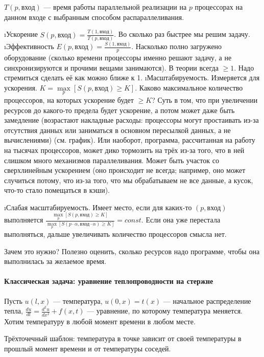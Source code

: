 $T(p, \text{вход})$ --- время работы параллельной реализации на $p$ процессорах на данном входе с выбранным способом распараллеливания.
\begin{enumerate}
\i Ускорение $S(p, \text{вход}) = \frac{T(1, \text{вход})}{T(p, \text{вход})}$. Во сколько раз быстрее мы решим задачу.
\i Эффективность $E(p, \text{вход}) = \frac{S(1, \text{вход})}{p}$. Насколько полно загружено оборудование (сколько времени процессоры именно решают задачу, а не синхронизируются и прочими вещами занимаются). В теории всегда $\ge 1$. Надо стремиться сделать её как можно ближе к 1.
\i Масштабируемость. Измеряется для ускорения. $K = \max\limits_p [S(p, \text{вход}) \ge K]$. Каково максимальное количество процессоров, на которых ускорение будет $\ge K$? Суть в том, что при увеличении ресурсов до какого-то предела будет ускорение, а потом может даже быть замедление (возрастают накладные расходы: процессоры могут простаивать из-за отсутствия данных или заниматься в основном пересылкой данных, а не вычислениями) (см. график). Или наоборот, программа, рассчитанная на работу на тысячах процессоров, может дико тормозить на трёх из-за того, что в ней слишком много механизмов параллеливания. Может быть участок со сверхлинейным ускорением (оно происходит не всегда; например, оно может случиться потому, что из-за того, что мы обрабатываем не все данные, а кусок, что-то стало помещаться в кэши).

\i Слабая масштабируемость.
Имеет место, если для каких-то $(p, \text{вход})$ выполняется $\frac{\max\limits_p [S(p, \text{вход}) \ge K]}{\max\limits_p [S(p \cdot \alpha, \text{вход} \cdot \alpha) \ge K]} = const$.
Если она уже перестала выполняться, дальше увеличивать количество процессоров смысла нет.
\end{enumerate}

Зачем это нужно? Полезно оценить, сколько ресурсов надо программе, чтобы она выполнилась за желаемое время.

\paragraph{Классическая задача: уравнение теплопроводности на стержне}
Пусть $u(l, x)$ --- температура, $u(0, x) = t(x)$ --- начальное распределение тепла, $\frac{du}{dt} = \frac{d^2u}{dx^2} + f(x, t)$ --- уравнение, по которому температура меняется. Хотим температуру в любой момент времени в любом месте.

Трёхточечный шаблон: температура в точке зависит от своей температуры в прошлый момент времени и от температуры соседей.


